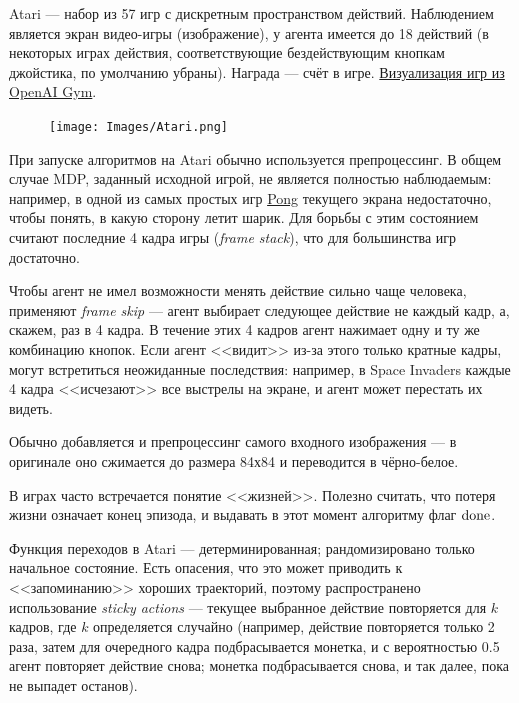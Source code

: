 \begin{example}
Atari --- набор из 57 игр с дискретным пространством действий. Наблюдением является экран видео-игры (изображение), у агента имеется до 18 действий (в некоторых играх действия, соответствующие бездействующим кнопкам джойстика, по умолчанию убраны). Награда --- счёт в игре. \href{https://gym.openai.com/envs/#atari}{Визуализация игр из OpenAI Gym}.

\begin{figure}
\centering
\vspace{-0.3cm}
\texttt{[image: Images/Atari.png]}
\vspace{-0.8cm}
\end{figure}

При запуске алгоритмов на Atari обычно используется препроцессинг. В общем случае MDP, заданный исходной игрой, не является полностью наблюдаемым: например, в одной из самых простых игр \href{https://gym.openai.com/envs/Pong-v0/}{Pong} текущего экрана недостаточно, чтобы понять, в какую сторону летит шарик. Для борьбы с этим состоянием считают последние 4 кадра игры (\emph{frame stack}), что для большинства игр достаточно.

Чтобы агент не имел возможности менять действие сильно чаще человека, применяют \emph{frame skip} --- агент выбирает следующее действие не каждый кадр, а, скажем, раз в 4 кадра. В течение этих 4 кадров агент нажимает одну и ту же комбинацию кнопок. Если агент <<видит>> из-за этого только кратные кадры, могут встретиться неожиданные последствия: например, в Space Invaders каждые 4 кадра <<исчезают>> все выстрелы на экране, и агент может перестать их видеть.

\begin{remark}
Обычно добавляется и препроцессинг самого входного изображения --- в оригинале оно сжимается до размера 84х84 и переводится в чёрно-белое.
\end{remark}

\begin{remark}
В играх часто встречается понятие <<жизней>>. Полезно считать, что потеря жизни означает конец эпизода, и выдавать в этот момент алгоритму флаг $\mathrm{done}$. 
\end{remark}

Функция переходов в Atari --- детерминированная; рандомизировано только начальное состояние. Есть опасения, что это может приводить к <<запоминанию>> хороших траекторий, поэтому распространено использование \emph{sticky actions} --- текущее выбранное действие повторяется для $k$ кадров, где $k$ определяется случайно (например, действие повторяется только 2 раза, затем для очередного кадра подбрасывается монетка, и с вероятностью 0.5 агент повторяет действие снова; монетка подбрасывается снова, и так далее, пока не выпадет останов).


\end{example}
